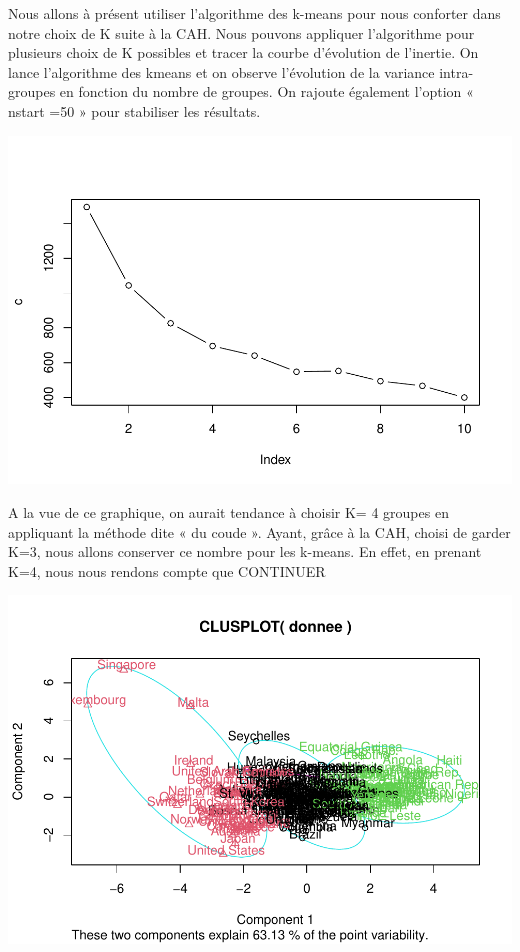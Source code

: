 \documentclass[
]{article}
\newenvironment{Shaded}{}{}
\newcommand{\AttributeTok}[1]{#1}
\newcommand{\DecValTok}[1]{#1}
\newcommand{\FunctionTok}[1]{#1}
\newcommand{\NormalTok}[1]{#1}
\newcommand{\OtherTok}[1]{\textcolor[rgb]{1.00,0.25,0.00}{#1}}
\newcommand{\SpecialCharTok}[1]{\textcolor[rgb]{0.00,0.50,0.50}{#1}}
\begin{document}
Nous allons à présent utiliser l'algorithme des k-means pour nous
conforter dans notre choix de K suite à la CAH. Nous pouvons appliquer
l'algorithme pour plusieurs choix de K possibles et tracer la courbe
d'évolution de l'inertie. On lance l'algorithme des kmeans et on observe
l'évolution de la variance intra-groupes en fonction du nombre de
groupes. On rajoute également l'option « nstart =50 » pour stabiliser
les résultats.

\includegraphics{Projet_files/figure-latex/unnamed-chunk-20-1.pdf}

A la vue de ce graphique, on aurait tendance à choisir K= 4 groupes en
appliquant la méthode dite « du coude ». Ayant, grâce à la CAH, choisi
de garder K=3, nous allons conserver ce nombre pour les k-means. En
effet, en prenant K=4, nous nous rendons compte que CONTINUER

\begin{Shaded}
\end{Shaded}

\includegraphics{Projet_files/figure-latex/unnamed-chunk-21-1.pdf}
\end{document}
